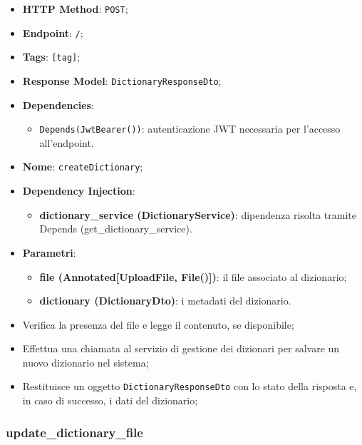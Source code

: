 \begin{itemize}
  \item \textbf{HTTP Method}: \texttt{POST};
  \item \textbf{Endpoint}: \texttt{/};
  \item \textbf{Tags}: \texttt{[tag]};
  \item \textbf{Response Model}: \texttt{DictionaryResponseDto};
  \item \textbf{Dependencies}:
  \begin{itemize}
    \item \texttt{Depends(JwtBearer())}: autenticazione JWT necessaria per l'accesso all'endpoint.
  \end{itemize}
  \item \textbf{Nome}: \texttt{createDictionary};
  \item \textbf{Dependency Injection}:
  \begin{itemize}
    \item \textbf{dictionary\_service (DictionaryService)}: dipendenza risolta tramite Depends (get\_dictionary\_service).
  \end{itemize}
  \item \textbf{Parametri}:
  \begin{itemize}
    \item \textbf{file (Annotated[UploadFile, File()])}: il file associato al dizionario;
    \item \textbf{dictionary (DictionaryDto)}: i metadati del dizionario.
  \end{itemize}
\end{itemize}

\begin{itemize}
  \item Verifica la presenza del file e legge il contenuto, se disponibile;
  \item Effettua una chiamata al servizio di gestione dei dizionari per salvare un nuovo dizionario nel sistema;
  \item Restituisce un oggetto \texttt{DictionaryResponseDto} con lo stato della risposta e, in caso di successo, i dati del dizionario;
\end{itemize}

\subsubsection{update\_dictionary\_file}

